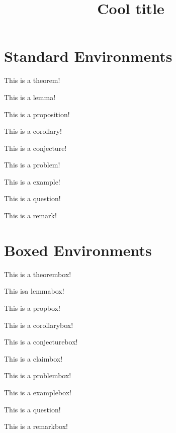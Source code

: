 \documentclass{scrartcl}
\title{Cool title}
\begin{document}
\maketitle



\section{Standard Environments}
\begin{theorem}
    This is a theorem!
\end{theorem}
\begin{lemma}
    This is a lemma!
\end{lemma}
\begin{proposition}
    This is a proposition!
\end{proposition}
\begin{corollary}
    This is a corollary!
\end{corollary}
\begin{conjecture}
    This is a conjecture!
\end{conjecture}
\begin{problem}
    This is a problem!
\end{problem}
\begin{example}
    This is a example!
\end{example}
\begin{question}
    This is a question!
\end{question}
\begin{remark}
    This is a remark!
\end{remark}

\newpage

\section{Boxed Environments}
\begin{theorembox}
    This is a theorembox!
\end{theorembox}
\begin{lemmabox}
    This isa lemmabox!
\end{lemmabox}
\begin{propbox}
    This is a propbox!
\end{propbox}
\begin{corollarybox}
    This is a corollarybox!
\end{corollarybox}
\begin{conjecturebox}
    This is a conjecturebox!
\end{conjecturebox}
\begin{claimbox}
    This is a claimbox!
\end{claimbox}
\begin{problembox}
    This is a problembox!
\end{problembox}
\begin{examplebox}
    This is a examplebox!
\end{examplebox}
\begin{questionbox}
    This is a question!
\end{questionbox}
\begin{remarkbox}
    This is a remarkbox!
\end{remarkbox}
\end{document}
